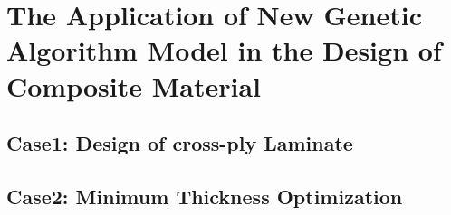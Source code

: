 
\chapter{The Application of New Genetic Algorithm Model in the Design of
Composite Material} %

\label{Chapter3} %

\section{Case1: Design of cross-ply Laminate}
%




%


\section{Case2: Minimum Thickness Optimization}
%
%
%
%




%
